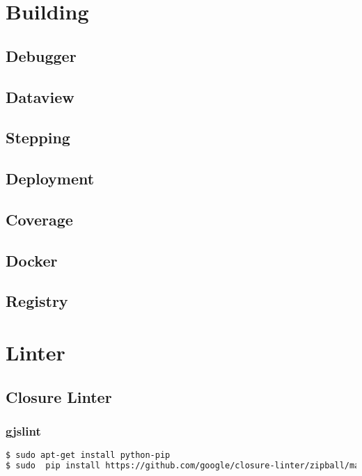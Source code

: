 \chapter{Building}



\section{Debugger}




\section{Dataview}



\section{Stepping}



\section{Deployment}



\section{Coverage}



\section{Docker}



\section{Registry}




\chapter{Linter}



\section{Closure Linter}



\subsection{gjslint}



\begin{lstlisting}[language=bash]
$ sudo apt-get install python-pip
$ sudo  pip install https://github.com/google/closure-linter/zipball/master
\end{lstlisting}


